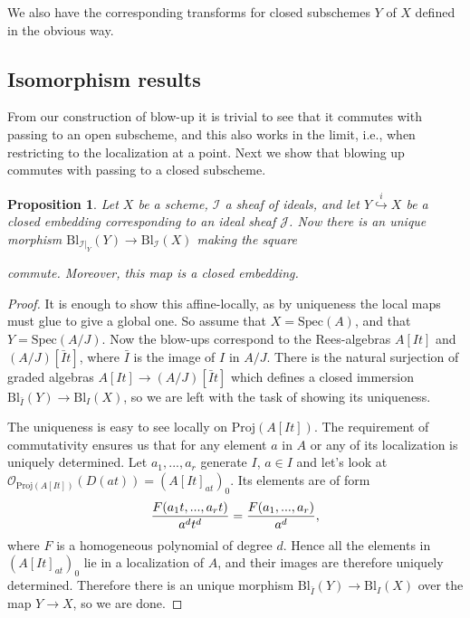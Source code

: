 \documentclass[12pt,a4paper,leqno]{article}
\newcommand{\OO}{\mathcal{O}}
\newcommand{\spec}{\mathrm{Spec}}
\newcommand{\bl}{\mathrm{Bl}}
\newcommand{\proj}{\mathrm{Proj}}
\theoremstyle{plain}
\newtheorem{prop}[theo]{Proposition}
\theoremstyle{definition}
\theoremstyle{remark}
\begin{document}
We also have the corresponding transforms for closed subschemes $Y$ of $X$ defined in the obvious way.

\subsection{Isomorphism results}

From our construction of blow-up it is trivial to see that it commutes with passing to an open subscheme, and this also works in the limit, i.e., when restricting to the localization at a point. Next we show that blowing up commutes with passing to a closed subscheme.

\begin{prop}\label{BlowUpCommutesWithClosedEmbeddings}
Let $X$ be a scheme, $\mathscr{I}$ a sheaf of ideals, and let $Y \stackrel{i}{\hookrightarrow} X$ be a closed embedding corresponding to an ideal sheaf $\mathscr{J}$. Now there is an unique morphism $\bl_{\mathscr{I}|_Y}(Y) \to \bl_{\mathscr{I}}(X)$ making the square
\begin{center}
\end{center}
commute. Moreover, this map is a closed embedding.
\end{prop}
\begin{proof}
It is enough to show this affine-locally, as by uniqueness the local maps must glue to give a global one. So assume that $X = \spec (A)$, and that $Y = \spec (A/J)$. Now the blow-ups correspond to the Rees-algebras $A[It]$ and $(A/J)[\bar{I}t]$, where $\bar I$ is the image of $I$ in $A/J$. There is the natural surjection of graded algebras $A[It] \to (A/J)[\bar{I}t]$ which defines a closed immersion $\bl_{\bar{I}} (Y) \to \bl_I (X)$, so we are left with the task of showing its uniqueness.

The uniqueness is easy to see locally on $\proj (A[It])$. The requirement of commutativity ensures us that for any element $a$ in $A$ or any of its localization is uniquely determined. Let $a_1,...,a_r$ generate $I$, $a \in I$ and let's look at $\OO_{\proj (A[It])} (D(at)) = (A[It]_{at})_0$. Its elements are of form
\begin{equation*}
{F(a_1t,...,a_rt) \over a^dt^d} = {F(a_1,...,a_r) \over a^d},
\end{equation*}
where $F$ is a homogeneous polynomial of degree $d$. Hence all the elements in $(A[It]_{at})_0$ lie in a localization of $A$, and their images are therefore uniquely determined. Therefore there is an unique morphism $\bl_{\bar{I}} (Y) \to \bl_I (X)$ over the map $Y \to X$, so we are done.
\end{proof}
\end{document}

